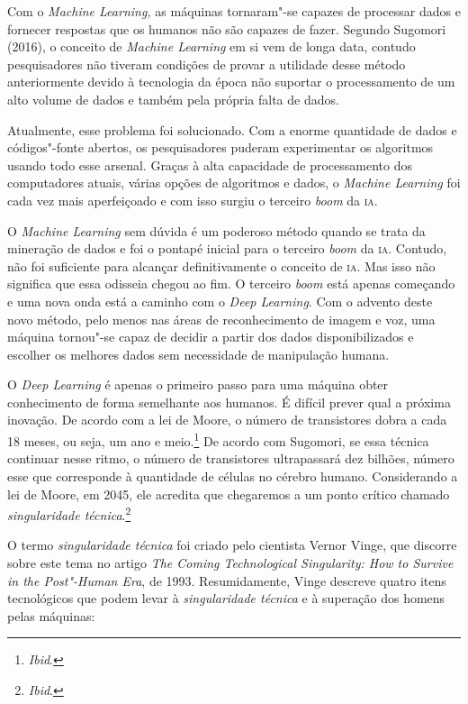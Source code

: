 Com o \textit{Machine Learning,} as máquinas tornaram"-se capazes de
processar dados e fornecer respostas que os humanos não são capazes de
fazer. Segundo Sugomori (2016), o conceito de \textit{Machine Learning} em
si vem de longa data, contudo pesquisadores não tiveram condições de
provar a utilidade desse método anteriormente devido à tecnologia da
época não suportar o processamento de um alto volume de dados e também
pela própria falta de dados.

Atualmente, esse problema foi solucionado. Com a enorme quantidade de
dados e códigos"-fonte abertos, os pesquisadores puderam experimentar os
algoritmos usando todo esse arsenal. Graças à alta capacidade de
processamento dos computadores atuais, várias opções de algoritmos e
dados, o \textit{Machine Learning} foi cada vez mais aperfeiçoado e com
isso surgiu o terceiro \textit{boom} da \textsc{ia}.

O \textit{Machine Learning} sem dúvida é um poderoso método quando se
trata da mineração de dados e foi o pontapé inicial para o terceiro
\textit{boom} da \textsc{ia}. Contudo, não foi suficiente para alcançar
definitivamente o conceito de \textsc{ia}. Mas isso não significa que essa
odisseia chegou ao fim. O terceiro \textit{boom} está apenas começando e uma nova
onda está a caminho com o \textit{Deep Learning}. Com o advento deste novo
método, pelo menos nas áreas de reconhecimento de imagem e voz, uma
máquina tornou"-se capaz de decidir a partir dos dados disponibilizados e
escolher os melhores dados sem necessidade de manipulação humana.

O \textit{Deep Learning} é apenas o primeiro passo para uma máquina obter
conhecimento de forma semelhante aos humanos. É difícil prever qual a
próxima inovação. De acordo com a lei de Moore, o número de transistores
dobra a cada 18 meses, ou seja, um ano e meio.\footnote{\textit{Ibid}.} De
acordo com Sugomori, se essa técnica continuar nesse ritmo, o número de
transistores ultrapassará dez bilhões, número esse que corresponde à
quantidade de células no cérebro humano. Considerando a lei de Moore, em
2045, ele acredita que chegaremos a um ponto crítico chamado
\textit{singularidade técnica}.\footnote{\textit{Ibid}.}

O termo \textit{singularidade técnica} foi criado pelo cientista Vernor
Vinge, que discorre sobre este tema no artigo \textit{The Coming
Technological Singularity: How to Survive in the Post"-Human Era}, de 1993.
Resumidamente, Vinge descreve quatro itens tecnológicos
que podem levar à \textit{singularidade técnica} e à superação dos homens
pelas máquinas:


